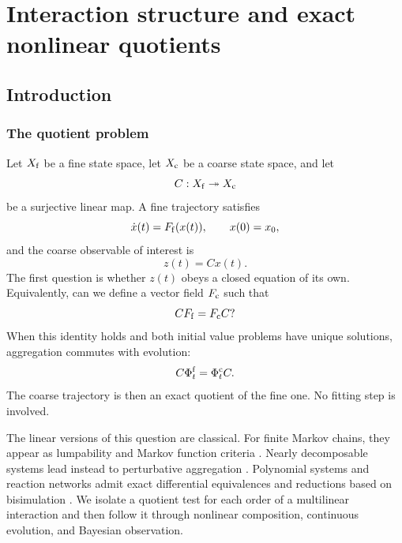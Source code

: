 
\chapter{Interaction structure and exact nonlinear quotients}\label{PRIQ:book:chapter-39}
\section{Introduction}

\subsection{The quotient problem}
Let $X_{\mathrm f}$ be a fine state space, let $X_{\mathrm c}$ be a coarse state space, and let
\[
  C:X_{\mathrm f}\twoheadrightarrow X_{\mathrm c}
\]
be a surjective linear map.  A fine trajectory satisfies
\begin{equation}\label{PRIQ:eq:fine-flow-intro}
  \dot x(t)=F_{\mathrm f}(x(t)),
  \qquad x(0)=x_0,
\end{equation}
and the coarse observable of interest is
\[
  z(t)=Cx(t).
\]
The first question is whether $z(t)$ obeys a closed equation of its own.  Equivalently, can we define a vector field $F_{\mathrm c}$ such that
\begin{equation}\label{PRIQ:eq:vector-field-quotient-intro}
  C F_{\mathrm f}=F_{\mathrm c}C?
\end{equation}
When this identity holds and both initial value problems have unique solutions, aggregation commutes with evolution:
\begin{equation}\label{PRIQ:eq:flow-quotient-intro}
  C\Phi_t^{\mathrm f}=\Phi_t^{\mathrm c}C.
\end{equation}
The coarse trajectory is then an exact quotient of the fine one.  No fitting step is involved.

The linear versions of this question are classical.  For finite Markov chains, they appear as lumpability and Markov function criteria \cite{PRIQ:KemenySnell1960,PRIQ:RogersPitman1981,PRIQ:Buchholz1994}.  Nearly decomposable systems lead instead to perturbative aggregation \cite{PRIQ:SimonAndo1961,PRIQ:Meyer1989}.  Polynomial systems and reaction networks admit exact differential equivalences and reductions based on bisimulation \cite{PRIQ:Cardelli2015,PRIQ:Cardelli2017}.  We isolate a quotient test for each order of a multilinear interaction and then follow it through nonlinear composition, continuous evolution, and Bayesian observation.

